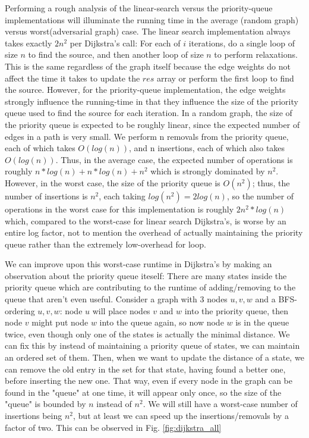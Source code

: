 \documentclass[conference]{IEEEtran}
\begin{document}
Performing a rough analysis of the linear-search versus the priority-queue implementations will illuminate the running time in the average (random graph) versus worst(adversarial graph) case. The linear search implementation always takes exactly $2n^2$ per Dijkstra's call: For each of $i$ iterations, do a single loop of size $n$ to find the source, and then another loop of size $n$ to perform relaxations. This is the same regardless of the graph itself because the edge weights do not affect the time it takes to update the $res$ array or perform the first loop to find the source. However, for the priority-queue implementation, the edge weights strongly influence the running-time in that they influence the size of the priority queue used to find the source for each iteration. In a random graph, the size of the priority queue is expected to be roughly linear, since the expected number of edges in a path is very small. We perform n removals from the priority queue, each of which takes $O(log(n))$, and n insertions, each of which also takes $O(log(n))$. Thus, in the average case, the expected number of operations is roughly $n*log(n) + n*log(n) + n^2$ which is strongly dominated by $n^2$. However, in the worst case, the size of the priority queue is $O(n^2)$; thus, the number of insertions is $n^2$, each taking $log(n^2) = 2log(n)$, so the number of operations in the worst case for this implementation is roughly $2n^2*log(n)$ which, compared to the worst-case for linear search Dijkstra's, is worse by an entire log factor, not to mention the overhead of actually maintaining the priority queue rather than the extremely low-overhead for loop. 

We can improve upon this worst-case runtime in Dijkstra's by making an observation about the priority queue iteself: There are many states inside the priority queue which are contributing to the runtime of adding/removing to the queue that aren't even useful. Consider a graph with 3 nodes $u,v,w$ and a BFS-ordering $u,v,w$: node $u$ will place nodes $v$ and $w$ into the priority queue, then node $v$ might put node $w$ into the queue again, so now node $w$ is in the queue twice, even though only one of the states is actually the minimal distance. We can fix this by instead of maintaining a priority queue of states, we can maintain an ordered set of them. Then, when we want to update the distance of a state, we can remove the old entry in the set for that state, having found a better one, before inserting the new one. That way, even if every node in the graph can be found in the "queue" at one time, it will appear only once, so the size of the "queue" is bounded by $n$ instead of $n^2$. We will still have a worst-case number of insertions being $n^2$, but at least we can speed up the insertions/removals by a factor of two. This can be observed in Fig. \ref{fig:dijkstra_all}
\end{document}
